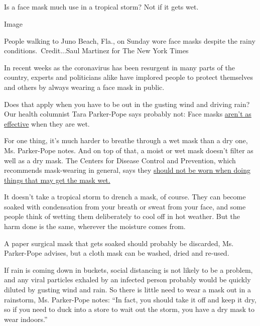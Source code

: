 \hypertarget{-3}{%
\subsection{}\label{-3}}

Is a face mask much use in a tropical storm? Not if it gets wet.

Image

People walking to Juno Beach, Fla., on Sunday wore face masks despite
the rainy conditions.~Credit...Saul Martinez for The New York Times

In recent weeks as the coronavirus has been resurgent in many parts of
the country, experts and politicians alike have implored people to
protect themselves and others by always wearing a face mask in public.

Does that apply when you have to be out in the gusting wind and driving
rain? Our health columnist Tara Parker-Pope says probably not: Face
masks
\href{https://www.nursingtimes.net/clinical-archive/infection-control/the-effectiveness-of-surgical-face-masks-what-the-literature-shows-30-09-2003/}{aren't
as effective} when they are wet.

For one thing, it's much harder to breathe through a wet mask than a dry
one, Ms. Parker-Pope notes. And on top of that, a moist or wet mask
doesn't filter as well as a dry mask. The Centers for Disease Control
and Prevention, which recommends mask-wearing in general, says they
\href{https://www.cdc.gov/coronavirus/2019-ncov/prevent-getting-sick/cloth-face-cover-guidance.html}{should
not be worn when doing things that may get the mask wet.}

It doesn't take a tropical storm to drench a mask, of course. They can
become soaked with condensation from your breath or sweat from your
face, and some people think of wetting them deliberately to cool off in
hot weather. But the harm done is the same, wherever the moisture comes
from.

A paper surgical mask that gets soaked should probably be discarded, Ms.
Parker-Pope advises, but a cloth mask can be washed, dried and re-used.

If rain is coming down in buckets, social distancing is not likely to be
a problem, and any viral particles exhaled by an infected person
probably would be quickly diluted by gusting wind and rain. So there is
little need to wear a mask out in a rainstorm, Ms. Parker-Pope notes:
``In fact, you should take it off and keep it dry, so if you need to
duck into a store to wait out the storm, you have a dry mask to wear
indoors.''

